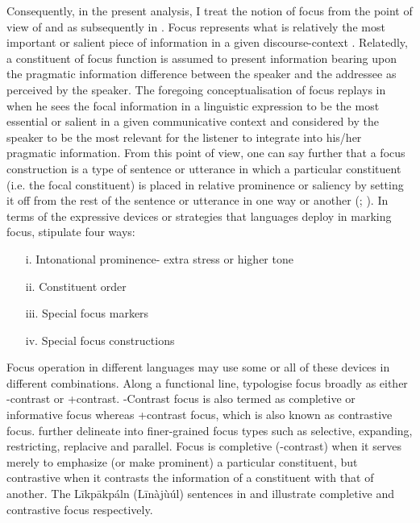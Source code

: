 \documentclass[output=paper,colorlinks,citecolor=brown]{langscibook}
\begin{document}
Consequently, in the present analysis, I treat the notion of focus from the point of view of \citet{DikVanderHulst1981} and as subsequently in \citet{Dik1997}. Focus represents what is relatively the most important or salient piece of information in a given discourse-context \citep[42]{DikVanderHulst1981}. Relatedly, a constituent of focus function is assumed to present information bearing upon the pragmatic information difference between the speaker and the addressee as perceived by the speaker. The foregoing conceptualisation of focus replays in \citet[326]{Dik1997} when he sees the focal information in a linguistic expression to be the most essential or salient in a given communicative context and considered by the speaker to be the most relevant for the listener to integrate into his/her pragmatic information. From this point of view, one can say further that a focus construction is a type of sentence or utterance in which a particular constituent (i.e. the focal constituent) is placed in relative prominence or saliency by setting it off from the rest of the sentence or utterance in one way or another (\citealt{Boadi1974, DrubigSchaffer2001}; \citealt[185]{MarfoBodomo2005}). In terms of the expressive devices or strategies that languages deploy in marking focus, \citet[43]{DikVanderHulst1981} stipulate four ways:

\begin{itemize}
    \item[i.] Intonational prominence- extra stress or higher tone
    \item[ii.] Constituent order
    \item [iii.] Special focus markers
    \item [iv.] Special focus constructions
\end{itemize}

Focus operation in different languages may use some or all of these devices in different combinations. Along a functional line, \citet[60]{DikVanderHulst1981} typologise focus broadly as either -contrast or +contrast. -Contrast focus is also termed as completive or informative focus whereas +contrast focus, which is also known as contrastive focus. \citet{Akrofi-Ansah2014, Schwarz2009, SkopeteasEtAl2006} further delineate into finer-grained focus types such as selective, expanding, restricting, replacive and parallel. Focus is completive (-contrast) when it serves merely to emphasize (or make prominent) a particular constituent, but contrastive when it contrasts the information of a constituent with that of another. The Līkpākpáln (Līnàjùúl) sentences in  and  illustrate completive and contrastive focus respectively.
\end{document}
